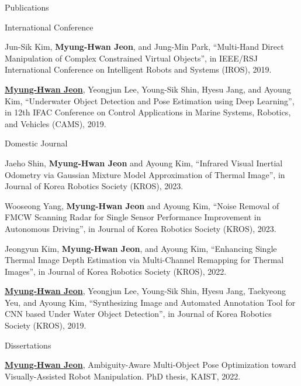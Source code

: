 \begin{rSection}{Publications}
\begin{pubSubsection}{International Conference}
  \item Jun-Sik Kim, \textbf{Myung-Hwan Jeon}, and Jung-Min Park, “Multi-Hand Direct Manipulation of Complex Constrained Virtual Objects”, in IEEE/RSJ International Conference on Intelligent Robots and Systems (IROS), 2019.%
  
  \item \underline{\textbf{Myung-Hwan Jeon}}, Yeongjun Lee, Young-Sik Shin, Hyesu Jang, and Ayoung Kim, “Underwater Object Detection and Pose Estimation using Deep Learning”, in 12th IFAC Conference on Control Applications in Marine Systems, Robotics, and Vehicles (CAMS), 2019.

\end{pubSubsection}

\begin{pubSubsection}{Domestic Journal}

  \item Jaeho Shin, \textbf{Myung-Hwan Jeon} and Ayoung Kim, “Infrared Visual Inertial Odometry via Gaussian Mixture Model Approximation of Thermal Image”, in Journal of Korea Robotics Society (KROS), 2023.
  
  \item Wooseong Yang, \textbf{Myung-Hwan Jeon} and Ayoung Kim, “Noise Removal of FMCW Scanning Radar for Single Sensor Performance Improvement in Autonomous Driving”, in Journal of Korea Robotics Society (KROS), 2023.

  \item Jeongyun Kim, \textbf{Myung-Hwan Jeon}, and Ayoung Kim, “Enhancing Single Thermal Image Depth Estimation via Multi-Channel Remapping for Thermal Images”, in Journal of Korea Robotics Society (KROS), 2022.
  
  \item \underline{\textbf{Myung-Hwan Jeon}}, Yeongjun Lee, Young-Sik Shin, Hyesu Jang, Taekyeong Yeu, and Ayoung Kim, “Synthesizing Image and Automated Annotation Tool for CNN based Under Water Object Detection”, in Journal of Korea Robotics Society (KROS), 2019.
  
\end{pubSubsection}

\begin{pubSubsection}{Dissertations}
  \item \underline{\textbf{Myung-Hwan Jeon}}, Ambiguity-Aware Multi-Object Pose Optimization toward Visually-Assisted Robot Manipulation. PhD thesis, \acf{KAIST}, 2022.
  

\end{pubSubsection}
\end{rSection}
